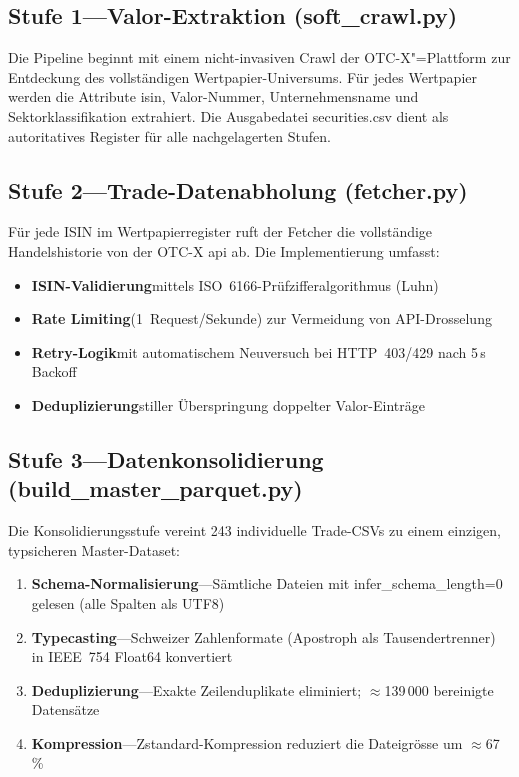 \documentclass[11pt, a4paper, oneside, openany]{report}
\newcommand{\code}[1]{{\codefont\small\textcolor{DeepNavy}{#1}}}
\begin{document}
\subsection{Stufe 1\;---\;Valor-Extraktion (\code{soft\_crawl.py})}

Die Pipeline beginnt mit einem nicht-invasiven Crawl der OTC-X"=Plattform zur Entdeckung des vollständigen Wertpapier-Universums. Für jedes Wertpapier werden die Attribute \gls{isin}, Valor-Nummer, Unternehmensname und Sektorklassifikation extrahiert. Die Ausgabedatei \code{securities.csv} dient als autoritatives Register für alle nachgelagerten Stufen.

\subsection{Stufe 2\;---\;Trade-Datenabholung (\code{fetcher.py})}

Für jede ISIN im Wertpapierregister ruft der Fetcher die vollständige Handelshistorie von der OTC-X \gls{api} ab. Die Implementierung umfasst:

\begin{itemize}
  \item \textbf{ISIN-Validierung}\;mittels ISO~6166-Prüfzifferalgorithmus (Luhn)
  \item \textbf{Rate Limiting}\;(1~Request/Sekunde) zur Vermeidung von API-Drosselung
  \item \textbf{Retry-Logik}\;mit automatischem Neuversuch bei HTTP~403/429 nach 5\,s Backoff
  \item \textbf{Deduplizierung}\;stiller Überspringung doppelter Valor-Einträge
\end{itemize}

\subsection{Stufe 3\;---\;Datenkonsolidierung (\code{build\_master\_parquet.py})}

Die Konsolidierungsstufe vereint 243 individuelle Trade-CSVs zu einem einzigen, typsicheren Master-Dataset:

\begin{enumerate}
  \item \textbf{Schema-Normalisierung}\;---\;Sämtliche Dateien mit \code{infer\_schema\_length=0} gelesen (alle Spalten als UTF8)
  \item \textbf{Typecasting}\;---\;Schweizer Zahlenformate (Apostroph als Tausendertrenner) in IEEE~754 Float64 konvertiert
  \item \textbf{Deduplizierung}\;---\;Exakte Zeilenduplikate eliminiert; $\approx$139\,000 bereinigte Datensätze
  \item \textbf{Kompression}\;---\;Zstandard-Kompression reduziert die Dateigrösse um $\approx$67\,\%
\end{enumerate}
\end{document}
